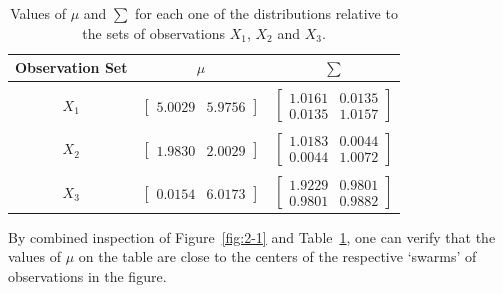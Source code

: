 \documentclass[paper=a4, fontsize=11pt]{scrartcl} %
\numberwithin{equation}{section} %
\numberwithin{figure}{section} %
\numberwithin{table}{section} %
\begin{document}
\begin{table}[H]
\begin{center}
    \begin{threeparttable}
    \small
        \begin{tabularx}{0.60\textwidth}{ c | c | c  }
            \textbf{Observation Set}    & \boldmath$\mu$ & \boldmath$\sum$\\ [0.5ex]
            \hline 
            & & \\ [0.0ex]
            ${X}_{1}$   & $\begin{bmatrix}  5.0029 & 5.9756 \end{bmatrix}$ & $\begin{bmatrix} 1.0161 & 0.0135 \\ 0.0135 & 1.0157 \end{bmatrix}$\\ [0.5ex]
            & & \\ [0.0ex]
            ${X}_{2}$   & $\begin{bmatrix}  1.9830 & 2.0029 \end{bmatrix}$ & $\begin{bmatrix} 1.0183 & 0.0044 \\ 0.0044 & 1.0072 \end{bmatrix}$\\ [0.5ex]
            & & \\ [0.0ex]
            ${X}_{3}$   & $\begin{bmatrix}  0.0154 & 6.0173 \end{bmatrix}$ & $\begin{bmatrix} 1.9229 & 0.9801 \\ 0.9801 & 0.9882 \end{bmatrix}$\\ [0.5ex]
        \end{tabularx}

    \caption{Values of $\mu$ and $\sum$ for each one of the distributions 
        relative to the sets of observations $X_1$, $X_2$ and $X_3$.}
    \label{tab:2-2}
    \end{threeparttable}
    \end{center}
\end{table}

By combined inspection of Figure~\ref{fig:2-1} and Table~\ref{tab:2-2}, one can 
verify that the values of $\mu$ on the table are close to the centers of the 
respective `swarms' of observations in the figure.\\
\end{document}
